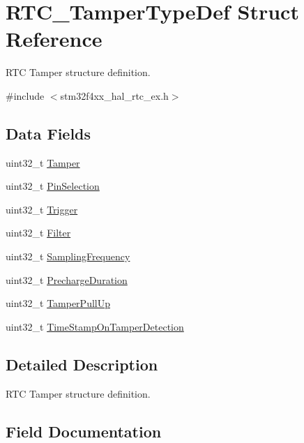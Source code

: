 \hypertarget{struct_r_t_c___tamper_type_def}{}\section{R\+T\+C\+\_\+\+Tamper\+Type\+Def Struct Reference}
\label{struct_r_t_c___tamper_type_def}


R\+TC Tamper structure definition.  




{\ttfamily \#include $<$stm32f4xx\+\_\+hal\+\_\+rtc\+\_\+ex.\+h$>$}

\subsection*{Data Fields}
\begin{DoxyCompactItemize}
\item 
uint32\+\_\+t \hyperlink{struct_r_t_c___tamper_type_def_a72b82da6f13071bcc8cb68276daf3c5e}{Tamper}
\item 
uint32\+\_\+t \hyperlink{struct_r_t_c___tamper_type_def_a676c56a1ad581d88cf71b5b54d5f7075}{Pin\+Selection}
\item 
uint32\+\_\+t \hyperlink{struct_r_t_c___tamper_type_def_a0266f7aca365a9cf468cc2571d9f9395}{Trigger}
\item 
uint32\+\_\+t \hyperlink{struct_r_t_c___tamper_type_def_a41c032d76e9694654be4a80a572680c6}{Filter}
\item 
uint32\+\_\+t \hyperlink{struct_r_t_c___tamper_type_def_a1822a9001e16621e16cd87b065b92e2a}{Sampling\+Frequency}
\item 
uint32\+\_\+t \hyperlink{struct_r_t_c___tamper_type_def_ad447306575b3590e268fe3398f9bb517}{Precharge\+Duration}
\item 
uint32\+\_\+t \hyperlink{struct_r_t_c___tamper_type_def_a6e849894076222b74c7fa8430b6e176c}{Tamper\+Pull\+Up}
\item 
uint32\+\_\+t \hyperlink{struct_r_t_c___tamper_type_def_ae2685d2368c30ca2eeb3bd05c5094b2a}{Time\+Stamp\+On\+Tamper\+Detection}
\end{DoxyCompactItemize}


\subsection{Detailed Description}
R\+TC Tamper structure definition. 

\subsection{Field Documentation}
\mbox{\label{struct_r_t_c___tamper_type_def_a41c032d76e9694654be4a80a572680c6}} 
